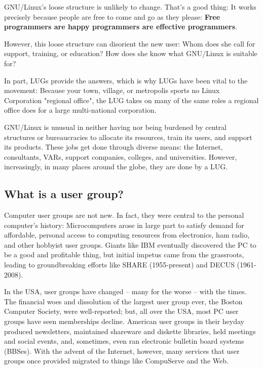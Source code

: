 GNU/Linux's loose structure is unlikely to change.  That's a good thing:
It works precisely because people are free to come and go as they
please: {\bfseries Free programmers are happy programmers are effective
programmers}.

However, this loose structure can disorient the new user: Whom
does she call for support, training, or education? How does she know
what GNU/Linux is suitable for?

In part, LUGs provide the answers, which is why LUGs have been vital to
the movement: Because your town, village, or metropolis sports no
Linux Corporation "regional office", the LUG takes on many of the same
roles a regional office does for a large multi-national corporation.

GNU/Linux is unusual in neither having nor being burdened by central
structures or bureaucracies to allocate its resources, train its users,
and support its products. These jobs get done through diverse means: the
Internet, consultants, VARs, support companies, colleges, and
universities. However, increasingly, in many places around the globe,
they are done by a LUG.




\subsection{What is a user group?}

Computer user groups are not new. In
fact, they were central to the personal computer's history:
Microcomputers arose in large part to satisfy demand for affordable,
personal access to computing resources from electronics, ham radio, and
other hobbyist user groups.  Giants like IBM eventually discovered the
PC to be a good and profitable thing, but initial impetus came from the
grassroots, leading to groundbreaking efforts like SHARE (1955-present) 
and DECUS (1961-2008).

In the USA, user groups have changed -- many for the worse --
with the times. The financial woes and dissolution of the largest user
group ever, the Boston Computer Society, were well-reported; but, all
over the USA, most PC user groups have seen memberships decline.
American user groups in their heyday produced newsletters, maintained
shareware and diskette libraries, held meetings and social events, and,
sometimes, even ran electronic bulletin board systems (BBSes). With the
advent of the Internet, however, many services that user groups once
provided migrated to things like CompuServe and the Web.

